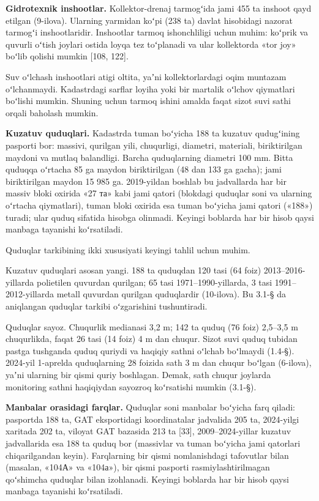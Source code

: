 \documentclass[14pt,a4paper,oneside]{extreport}
\begin{document}
\textbf{Gidrotexnik inshootlar.} Kollektor-drenaj tarmogʻida jami 455 ta
inshoot qayd etilgan (9-ilova). Ularning yarmidan koʻpi (238 ta) davlat
hisobidagi nazorat tarmogʻi inshootlaridir. Inshootlar tarmoq
ishonchliligi uchun muhim: koʻprik va quvurli oʻtish joylari ostida
loyqa tez toʻplanadi va ular kollektorda «tor joy» boʻlib qolishi mumkin
{[}108, 122{]}.

Suv oʻlchash inshootlari atigi oltita, yaʼni kollektorlardagi oqim
muntazam oʻlchanmaydi. Kadastrdagi sarflar loyiha yoki bir martalik
oʻlchov qiymatlari boʻlishi mumkin. Shuning uchun tarmoq ishini amalda
faqat sizot suvi sathi orqali baholash mumkin.

\textbf{Kuzatuv quduqlari.} Kadastrda tuman boʻyicha 188 ta kuzatuv
qudugʻining pasporti bor: massivi, qurilgan yili, chuqurligi, diametri,
materiali, biriktirilgan maydoni va mutlaq balandligi. Barcha
quduqlarning diametri 100 mm. Bitta quduqqa oʻrtacha 85 ga maydon
biriktirilgan (48 dan 133 ga gacha); jami biriktirilgan maydon 15 985
ga. 2019-yildan boshlab bu jadvallarda har bir massiv bloki oxirida «27
та» kabi jami qatori (blokdagi quduqlar soni va ularning oʻrtacha
qiymatlari), tuman bloki oxirida esa tuman boʻyicha jami qatori («188»)
turadi; ular quduq sifatida hisobga olinmadi. Keyingi boblarda har bir
hisob qaysi manbaga tayanishi koʻrsatiladi.

Quduqlar tarkibining ikki xususiyati keyingi tahlil uchun muhim.

Kuzatuv quduqlari asosan yangi. 188 ta quduqdan 120 tasi (64 foiz)
2013--2016-yillarda polietilen quvurdan qurilgan; 65 tasi
1971--1990-yillarda, 3 tasi 1991--2012-yillarda metall quvurdan qurilgan
quduqlardir (10-ilova). Bu 3.1-§ da aniqlangan quduqlar tarkibi
oʻzgarishini tushuntiradi.

Quduqlar sayoz. Chuqurlik medianasi 3,2 m; 142 ta quduq (76 foiz)
2,5--3,5 m chuqurlikda, faqat 26 tasi (14 foiz) 4 m dan chuqur. Sizot
suvi quduq tubidan pastga tushganda quduq quriydi va haqiqiy sathni
oʻlchab boʻlmaydi (1.4-§). 2024-yil 1-aprelda quduqlarning 28 foizida
sath 3 m dan chuqur boʻlgan (6-ilova), yaʼni ularning bir qismi quriy
boshlagan. Demak, sath chuqur joylarda monitoring sathni haqiqiydan
sayozroq koʻrsatishi mumkin (3.1-§).

\textbf{Manbalar orasidagi farqlar.} Quduqlar soni manbalar boʻyicha
farq qiladi: pasportda 188 ta, GAT eksportidagi koordinatalar jadvalida
205 ta, 2024-yilgi xaritada 202 ta, viloyat GAT bazasida 213 ta
{[}33{]}, 2009--2024-yillar kuzatuv jadvallarida esa 188 ta quduq bor
(massivlar va tuman boʻyicha jami qatorlari chiqarilgandan keyin).
Farqlarning bir qismi nomlanishdagi tafovutlar bilan (masalan, «104А» va
«104а»), bir qismi pasporti rasmiylashtirilmagan qoʻshimcha quduqlar
bilan izohlanadi. Keyingi boblarda har bir hisob qaysi manbaga tayanishi
koʻrsatiladi.
\end{document}
